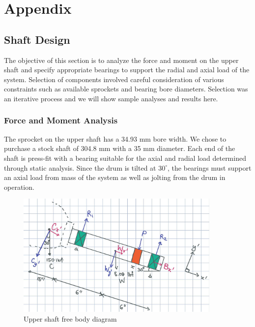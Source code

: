 \documentclass[letterpaper,12pt]{article}
\begin{document}
\newpage

\section{Appendix}
\subsection{Shaft Design}
The objective of this section is to analyze the force and moment on the upper shaft and specify appropriate bearings to support the radial and axial load of the system. Selection of components involved careful consideration of various constraints such as available sprockets and bearing bore diameters. Selection was an iterative process and we will show sample analyses and results here.

\subsubsection{Force and Moment Analysis}
The sprocket on the upper shaft has a 34.93 mm bore width. We chose to purchase a stock shaft of 304.8 mm with a 35 mm diameter. Each end of the shaft is press-fit with a bearing suitable for the axial and radial load determined through static analysis. Since the drum is tilted at $30^{\circ} $, the bearings must support an axial load from mass of the system as well as jolting from the drum in operation. 

\begin{figure}[h]
    \centering
    \includegraphics[width=10cm]{A3/MECH325A3FBD.jpg}
    \caption{Upper shaft free body diagram}
\end{figure}
    
\end{document}
